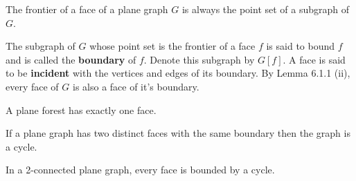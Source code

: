 \begin{corollary}
    The frontier of a face of a plane graph \(G\) is always the point set of a subgraph of \(G\).
\end{corollary}

The subgraph of \(G\) whose point set is the frontier of a face \(f\) is said to bound \(f\) and is called the \textbf{boundary} of \(f\). Denote this subgraph by \(G[f]\). A face is said to be \textbf{incident} with the vertices and edges of its boundary. By Lemma 6.1.1 (ii), every face of \(G\) is also a face of it's boundary.

\begin{proposition}
    A plane forest has exactly one face.
\end{proposition}

\begin{lemma}
    If a plane graph has two distinct faces with the same boundary then the graph is a cycle.
\end{lemma}

\begin{proposition}
    In a 2-connected plane graph, every face is bounded by a cycle.
\end{proposition}